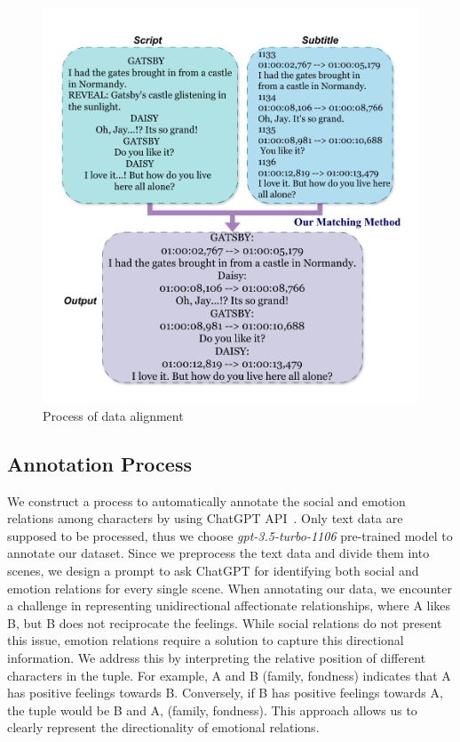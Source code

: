 \begin{figure}[ht]
    \small
    \centering 	 	 	 	
    \includegraphics[width=\linewidth, trim= 0 10 0 10, clip]{images/raw_data.pdf}
	\caption{Process of data alignment}
    \label{fig:alig}
\end{figure}

\subsection{Annotation Process}

We construct a process to automatically annotate the social and emotion relations among characters by using ChatGPT API~\citep{openai2023gpt35}. Only text data are supposed to be processed, thus we choose \textit{gpt-3.5-turbo-1106} pre-trained model to annotate our dataset. Since we preprocess the text data and divide them into scenes, we design a prompt to ask ChatGPT for identifying both social and emotion relations for every single scene. When annotating our data, we encounter a challenge in representing unidirectional affectionate relationships, where A likes B, but B does not reciprocate the feelings. While social relations do not present this issue, emotion relations require a solution to capture this directional information. We address this by interpreting the relative position of different characters in the tuple. For example, A and B (family, fondness) indicates that A has positive feelings towards B. Conversely, if B has positive feelings towards A, the tuple would be B and A, (family, fondness). This approach allows us to clearly represent the directionality of emotional relations.

